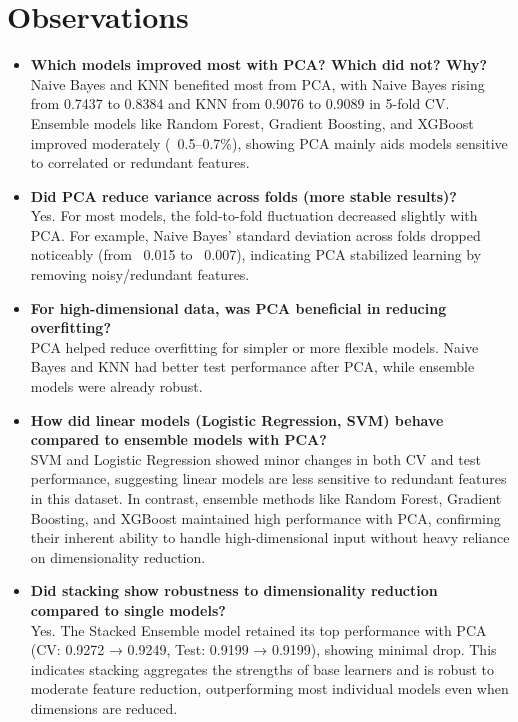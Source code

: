 \documentclass[11pt]{article}
\begin{document}
\vspace{0.5cm}
\section{Observations}
\begin{itemize}
    \item \textbf{Which models improved most with PCA? Which did not? Why?} \\
    Naive Bayes and KNN benefited most from PCA, with Naive Bayes rising from 0.7437 to 0.8384 and KNN from 0.9076 to 0.9089 in 5-fold CV. Ensemble models like Random Forest, Gradient Boosting, and XGBoost improved moderately (~0.5–0.7\%), showing PCA mainly aids models sensitive to correlated or redundant features.

    \item \textbf{Did PCA reduce variance across folds (more stable results)?} \\
    Yes. For most models, the fold-to-fold fluctuation decreased slightly with PCA. For example, Naive Bayes' standard deviation across folds dropped noticeably (from ~0.015 to ~0.007), indicating PCA stabilized learning by removing noisy/redundant features. 

    \item \textbf{For high-dimensional data, was PCA beneficial in reducing overfitting?} \\
    PCA helped reduce overfitting for simpler or more flexible models. Naive Bayes and KNN had better test performance after PCA, while ensemble models were already robust. 

    \item \textbf{How did linear models (Logistic Regression, SVM) behave compared to ensemble models with PCA?} \\
    SVM and Logistic Regression showed minor changes in both CV and test performance, suggesting linear models are less sensitive to redundant features in this dataset. In contrast, ensemble methods like Random Forest, Gradient Boosting, and XGBoost maintained high performance with PCA, confirming their inherent ability to handle high-dimensional input without heavy reliance on dimensionality reduction.  

    \item \textbf{Did stacking show robustness to dimensionality reduction compared to single models?} \\
    Yes. The Stacked Ensemble model retained its top performance with PCA (CV: 0.9272 → 0.9249, Test: 0.9199 → 0.9199), showing minimal drop. This indicates stacking aggregates the strengths of base learners and is robust to moderate feature reduction, outperforming most individual models even when dimensions are reduced.  
\end{itemize}
\end{document}
